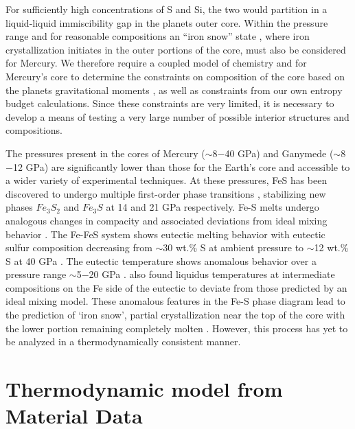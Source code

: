 For sufficiently high concentrations of S and Si, the two would partition in a
liquid-liquid immiscibility gap in the planets outer core. Within the pressure
range and for reasonable compositions an “iron snow” state
\citep{Chen2008,Williams2009}, where iron crystallization initiates in the outer portions of
the core, must also be considered for Mercury. We therefore require a
coupled model of chemistry and for Mercury’s core to determine the constraints
on composition of the core based on the planets gravitational moments
\citep{Smith2012}, as well as constraints from our own entropy budget calculations.
Since these constraints are very limited, it is necessary to develop a means of
testing a very large number of possible interior structures and compositions.

The pressures present in the cores of Mercury ($\sim$8$-$40 GPa) and Ganymede
($\sim$8$-$12 GPa) are significantly lower than those for the Earth's core and
accessible to a wider variety of experimental techniques. At these pressures, 
FeS has been discovered to undergo multiple first-order phase transitions
\cite{Fei1997,Fei2000}, stabilizing new phases $Fe_3S_2$ and $Fe_3S$ at 14 and 21 GPa 
respectively. Fe-S melts undergo analogous changes in compacity
\cite{Morard2007} and associated deviations from ideal mixing behavior
\cite{Chen2008}. The Fe-FeS system shows eutectic melting behavior with eutectic
sulfur composition decreasing from $\sim$30 wt.\% S at ambient pressure to $\sim$12 
wt.\% S at 40 GPa \cite{Chudinovskikh2007}. The eutectic temperature shows
anomalous behavior over a pressure range $\sim$5$-$20 GPa \cite{Fei1997,Chen2008}.
\citet{Chen2008} also found liquidus temperatures at intermediate
compositions on the Fe side of the eutectic to deviate from those predicted by
an ideal mixing model. These anomalous features in the Fe-S phase diagram lead
to the prediction of `iron snow', partial crystallization near the top of the
core with the lower portion remaining completely molten \cite{Hauck2006,Chen2008}.
However, this process has yet to be analyzed in a thermodynamically consistent
manner.

\section{Thermodynamic model from Material Data}

